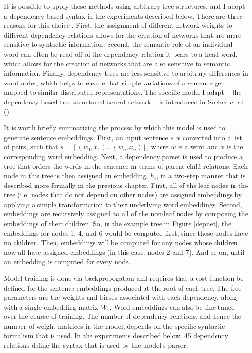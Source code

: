 It is possible to apply these methods using arbitrary tree structures, and I adopt a dependency-based syntax in the experiments described below. There are three reasons for this choice \citep{Socher:2014}. First, the assignment of different network weights to different dependency relations allows for the creation of networks that are more sensitive to syntactic information. Second, the semantic role of an individual word can often be read off of the dependency relation it bears to a head word, which allows for the creation of networks that are also sensitive to semantic information. Finally, dependency trees are less sensitive to arbitrary differences in word order, which helps to ensure that simple variations of a sentence get mapped to similar distributed representations. The specific model I adapt -- the dependency-based tree-structured neural network -- is introduced in Socher et al. (\citeyear{Socher:2014})

It is worth briefly summarizing the process by which this model is used to generate sentence embeddings. First, an input sentence $s$ is converted into a list of pairs, such that $s = [(w_1, x_1)...(w_n, x_n)]$, where $w$ is a word and $x$ is the corresponding word embedding. Next, a dependency parser is used to produce a tree that orders the words in the sentence in terms of parent-child relations. Each node in this tree is then assigned an embedding, $h_i$, in a two-step manner that is described more formally in the previous chapter. First, all of the leaf nodes in the tree (i.e. nodes that do not depend on other nodes) are assigned embeddings by applying a simple transformation to their underlying word embeddings. Second, embeddings are recursively assigned to all of the non-leaf nodes by composing the embeddings of their children. So, in the example tree in Figure \ref{depnet}, the embeddings for nodes 1, 4, and 6 would be computed first, since these nodes have no children. Then, embeddings will be computed for any nodes whose children now all have assigned embeddings (in this case, nodes 2 and 7). And so on, until an embedding is computed for every node.

Model training is done via backpropogation and requires that a cost function be defined for the sentence embeddings produced at the root of each tree. The free parameters are the weights and biases associated with each dependency, along with a single embedding matrix $W_v$. Word embeddings can also be fine-tuned over the course of training. The number of dependency relations, and hence the number of weight matrices in the model, depends on the specific syntactic formalism that is used. In the experiments described below, 45 dependency relations define the syntax that is used by the model's parser.

